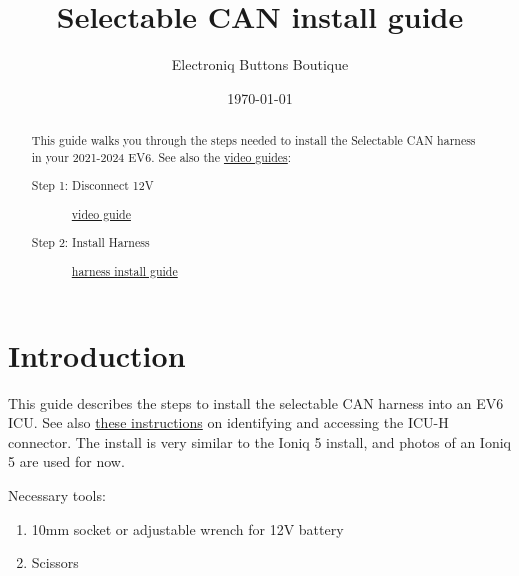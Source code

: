 \documentclass[superscriptaddress,onecolumn,floatfix]{revtex4-2}
\begin{document}
                            
\begin{abstract}
  This guide walks you through the steps needed to install the Selectable CAN harness in your 2021-2024 EV6. See also the \href{https://youtube.com/playlist?list=PLYCTmVJH4UYqnw87UZAaqMo1GrOv0cJaL}{video guides}:
  \begin{description}
    \item[Step 1: Disconnect 12V] \href{https://youtu.be/ePBdyeBYKk4}{video guide}
    \item[Step 2: Install Harness] \href{https://youtu.be/kVvkR4ZLFMI}{harness install guide}
  \end{description}
\end{abstract}
\title{Selectable CAN install guide}
\author{Electroniq Buttons Boutique}
\date{\today}

\maketitle


\section{Introduction}
This guide describes the steps to install the selectable CAN harness into an EV6 ICU. See also \href{https://github.com/dragz/explorationsincarhacking/blob/main/articles/getting_past_the_secure_gateway/getting_past_the_secure_gateway.md}{these instructions} on identifying and accessing the ICU-H connector. The install is very similar to the Ioniq 5 install, and photos of an Ioniq 5 are used for now.

Necessary tools:
\begin{enumerate}
  \item 10mm socket or adjustable wrench for 12V battery
  \item Scissors
\end{enumerate}
\end{document}
